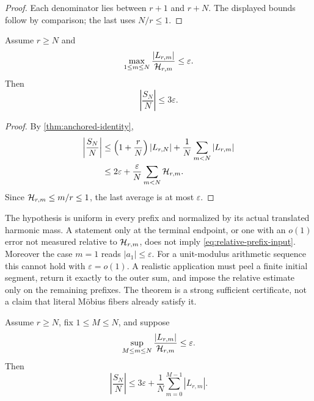 \begin{proof}
Each denominator lies between \(r+1\) and \(r+N\).  The displayed
bounds follow by comparison; the last uses \(N/r\le1\).
\end{proof}

\begin{theorem}
\label{thm:short-prefix-uniform}
Assume \(r\ge N\) and
\begin{equation}
 \max_{1\le m\le N}
 \frac{|L_{r,m}|}{\mathcal H_{r,m}}
 \le\varepsilon.
\label{eq:relative-prefix-input}
\end{equation}
Then
\begin{equation}
 \left|\frac{S_N}{N}\right|\le3\varepsilon.
\label{eq:short-prefix-output}
\end{equation}
\end{theorem}

\begin{proof}
By \cref{thm:anchored-identity},
\begin{align*}
 \left|\frac{S_N}{N}\right|
 &\le
 \left(1+\frac rN\right)|L_{r,N}|
 +\frac1N\sum_{m<N}|L_{r,m}|\\
 &\le
 2\varepsilon+
 \frac{\varepsilon}{N}\sum_{m<N}\mathcal H_{r,m}.
\end{align*}
Since \(\mathcal H_{r,m}\le m/r\le1\), the last average is at most
\(\varepsilon\).
\end{proof}

\begin{remark}
\label{rem:prefix-quantifier}
The hypothesis is uniform in every prefix and normalized by its
actual translated harmonic mass.  A statement only at the terminal
endpoint, or one with an \(o(1)\) error not measured relative to
\(\mathcal H_{r,m}\), does not imply \eqref{eq:relative-prefix-input}.
Moreover the case \(m=1\) reads \(|a_1|\le\varepsilon\).  For a
unit-modulus arithmetic sequence this cannot hold with
\(\varepsilon=o(1)\).  A realistic application must peel a finite
initial segment, return it exactly to the outer sum, and impose the
relative estimate only on the remaining prefixes.  The theorem is a
strong sufficient certificate, not a claim that literal M\"obius
fibers already satisfy it.
\end{remark}

\begin{corollary}
\label{cor:cutoff-prefix}
Assume \(r\ge N\), fix \(1\le M\le N\), and suppose
\[
 \sup_{M\le m\le N}
 \frac{|L_{r,m}|}{\mathcal H_{r,m}}
 \le\varepsilon.
\]
Then
\begin{equation}
 \left|\frac{S_N}{N}\right|
 \le
 3\varepsilon
 +
 \frac1N\sum_{m=0}^{M-1}|L_{r,m}|.
\label{eq:cutoff-prefix-output}
\end{equation}
\end{corollary}

